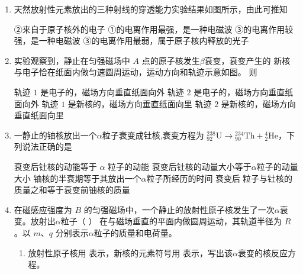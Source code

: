 \begin{enumerate}

\item 
{}
天然放射性元素放出的三种射线的穿透能力实验结果如图所示，由此可推知  
\begin{figure}[h!]
	\centering
	
\end{figure}


\fourchoices
{②来自于原子核外的电子}
{①的电离作用最强，是一种电磁波}
{③的电离作用较强，是一种电磁波}
{③的电离作用最弱，属于原子核内释放的光子}




\item 
{}
实验观察到，静止在匀强磁场中 $ A $ 点的原子核发生$ \beta $衰变，衰变产生的
新核与电子恰在纸面内做匀速圆周运动，运动方向和轨迹示意如图。
则  
\begin{figure}[h!]
	\centering
	
\end{figure}


\fourchoices
{轨迹 $ 1 $ 是电子的，磁场方向垂直纸面向外}
{轨迹 $ 2 $ 是电子的，磁场方向垂直纸面向外}
{轨迹 $ 1 $ 是新核的，磁场方向垂直纸面向里}
{轨迹 $ 2 $ 是新核的，磁场方向垂直纸面向里}



\item 
{}
一静止的铀核放出一个$ \alpha $粒子衰变成钍核,衰变方程为
${ }_{92}^{238} \mathrm{U} \rightarrow{ }_{90}^{234} \mathrm{Th}+{ }_{2}^{4} \mathrm{He}$，下列说法正确的是  


\fourchoices
{衰变后钍核的动能等于 $ \alpha $ 粒子的动能}
{衰变后钍核的动量大小等于$ \alpha $粒子的动量大小}
{铀核的半衰期等于其放出一个$ \alpha $粒子所经历的时间}
{衰变后粒子与钍核的质量之和等于衰变前铀核的质量}



\item 
{}
在磁感应强度为 $ B $ 的匀强磁场中，一个静止的放射性原子核发生了一次$ \alpha $衰变。放射出$ \alpha $粒子（    ）
在与磁场垂直的平面内做圆周运动，其轨道半径为 $ R $。以 $ m $、$ q $ 分别表示$ \alpha $粒子的质量和电荷量。
\begin{enumerate}
	\item
放射性原子核用  表示，新核的元素符号用  表示，写出该$ \alpha $衰变的核反应方程。


\end{enumerate}
\end{enumerate}
